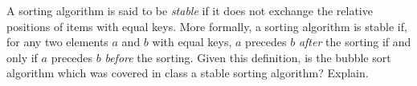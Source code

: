 A sorting algorithm is said to be {\em stable} if it does not exchange
the relative positions of items with equal keys.  More formally, a
sorting algorithm is stable if, for any two elements $a$ and $b$ with
equal keys, $a$ precedes $b$ {\em after} the sorting if and only if $a$
precedes $b$ {\em before} the sorting.  Given this definition, is the
bubble sort algorithm which was covered in class a stable sorting
algorithm? Explain.

